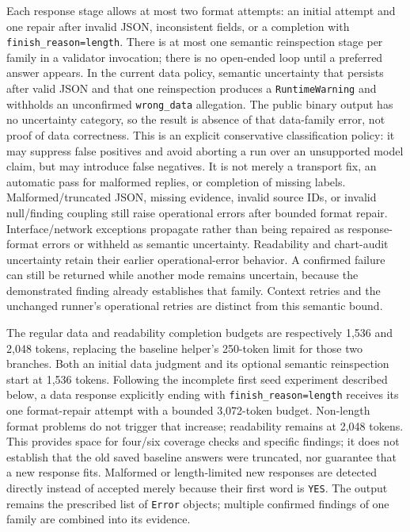 \documentclass[11pt]{article}
\begin{document}
Each response stage allows at most two format attempts: an initial
attempt and one repair after invalid JSON, inconsistent fields, or a
completion with \texttt{finish\_reason=length}. There is at most one
semantic reinspection stage per family in a validator invocation;
there is no open-ended loop until a preferred answer appears.
In the current data policy, semantic uncertainty that persists after
valid JSON and that one reinspection produces a \texttt{RuntimeWarning}
and withholds an unconfirmed \texttt{wrong\_data} allegation. The public
binary output has no uncertainty category, so the result is absence of
that data-family error, not proof of data correctness. This is an
explicit conservative classification policy: it may suppress false
positives and avoid aborting a run over an unsupported model claim,
but may introduce false negatives. It is not merely a transport fix,
an automatic pass for malformed replies, or completion of missing labels.
Malformed/truncated JSON, missing evidence, invalid source IDs, or invalid
null/finding coupling still raise operational errors after bounded format
repair. Interface/network exceptions propagate rather than being repaired
as response-format errors or withheld as semantic uncertainty.
Readability and chart-audit uncertainty
retain their earlier operational-error behavior. A confirmed failure
can still be returned while another mode remains uncertain, because the
demonstrated finding already establishes that family. Context retries
and the unchanged runner's operational retries are distinct from this
semantic bound.

The regular data and readability completion budgets are respectively
1,536 and 2,048 tokens, replacing the baseline helper's 250-token limit
for those two branches. Both an initial data judgment and its optional
semantic reinspection start at 1,536 tokens. Following the incomplete
first seed experiment described below, a data response explicitly ending
with \texttt{finish\_reason=length} receives its one format-repair
attempt with a bounded 3,072-token budget. Non-length format problems
do not trigger that increase; readability remains at 2,048 tokens.
This provides space for four/six coverage checks and specific findings;
it does not establish that the old saved baseline answers were truncated,
nor guarantee that a new response fits.
Malformed or length-limited new responses are detected directly instead
of accepted merely because their first word is \texttt{YES}.
The output remains the prescribed list of \texttt{Error} objects;
multiple confirmed findings of one family are combined into its evidence.
\end{document}
